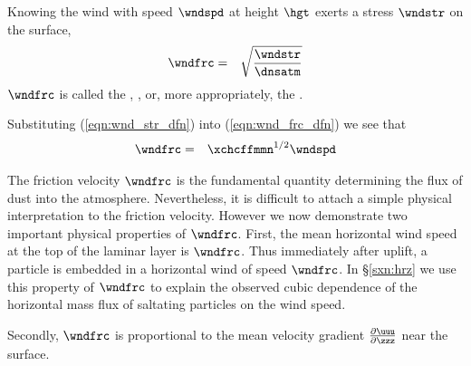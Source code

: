 \documentclass[12pt,twoside]{book}
\begin{document}
Knowing the wind with speed $\wndspd$ at height $\hgt$ exerts a stress
$\wndstr$ on the surface, 
\begin{eqnarray}
\wndfrc & = & \sqrt{ \frac{\wndstr}{\dnsatm} }
\label{eqn:wnd_frc_dfn}
\end{eqnarray}
$\wndfrc$ is called the , , or, more appropriately, the .

Substituting (\ref{eqn:wnd_str_dfn}) into (\ref{eqn:wnd_frc_dfn}) we
see that 
\begin{eqnarray}
\wndfrc & = & \xchcffmmn^{1/2} \wndspd
\label{eqn:wnd_frc_dfn_2}
\end{eqnarray}

The friction velocity $\wndfrc$ is the fundamental quantity
determining the flux of dust into the atmosphere.
Nevertheless, it is difficult to attach a simple physical
interpretation to the friction velocity.
However we now demonstrate two important physical properties of
$\wndfrc$.  
First, the mean horizontal wind speed at the top of the laminar layer
is $\wndfrc$. 
Thus immediately after uplift, a particle is embedded in a horizontal
wind of speed $\wndfrc$.
In \S\ref{sxn:hrz} we use this property of $\wndfrc$ to explain
the observed cubic dependence of the horizontal mass flux of saltating
particles on the wind speed. 

Secondly, $\wndfrc$ is proportional to the mean velocity gradient
$\frac{\partial \uuu}{\partial \zzz}$ near the surface.
\end{document}
